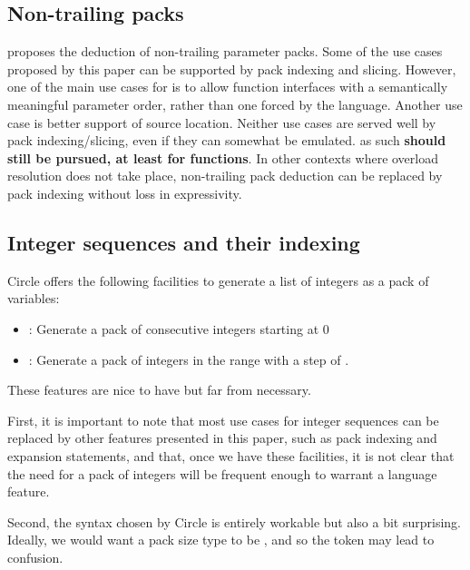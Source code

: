 \documentclass{wg21}
\begin{document}
\subsection{Non-trailing packs}
\label{sec:nontrailing}

 proposes the deduction of non-trailing parameter packs.
Some of the use cases proposed by this paper can be supported by pack indexing and slicing.
However, one of the main use cases for  is to allow function interfaces with
a semantically meaningful parameter order, rather than one forced by the language.
Another use case is better support of source location.
Neither use cases are served well by pack indexing/slicing, even if they can somewhat be emulated.
as such \textbf{ should still be pursued, at least for functions}.
In other contexts where overload resolution does not take place, non-trailing pack deduction
can be replaced by pack indexing without loss in expressivity.

\subsection{Integer sequences and their indexing}
\label{sec:indexsequence}

Circle offers the following facilities to generate a list of integers as a pack of variables:

\begin{itemize}
\item {} : Generate a pack of  consecutive integers starting at 0
\item {} : Generate a pack of integers in the range  with a step of .
\end{itemize}

These features are nice to have but far from necessary.

First, it is important to note that most use cases for integer sequences can be replaced by other features presented in this paper,
such as pack indexing and expansion statements, and that, once we have these facilities, it is not clear that the need for a
pack of integers will be frequent enough to warrant a language feature.

Second, the syntax chosen by Circle is entirely workable but also a bit surprising.
Ideally, we would want a pack size type to be , and so the token  may lead to confusion.
\end{document}
